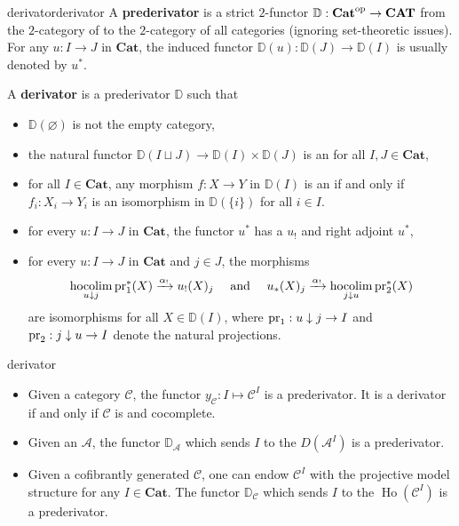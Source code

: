 \begin{topic}{derivator}{derivator}
    A \textbf{prederivator} is a strict $2$-functor $\mathbb{D} : \textbf{Cat}^\textup{op} \to \textbf{CAT}$ from the $2$-category of  to the $2$-category of all categories (ignoring set-theoretic issues). For any $u : I \to J$ in $\textbf{Cat}$, the induced functor $\mathbb{D}(u) : \mathbb{D}(J) \to \mathbb{D}(I)$ is usually denoted by $u^*$.

    A \textbf{derivator} is a prederivator $\mathbb{D}$ such that
    \begin{itemize}
        \item $\mathbb{D}(\varnothing)$ is not the empty category,
        \item the natural functor $\mathbb{D}(I \sqcup J) \to \mathbb{D}(I) \times \mathbb{D}(J)$ is an  for all $I, J \in \textbf{Cat}$,
        \item for all $I \in \textbf{Cat}$, any morphism $f : X \to Y$ in $\mathbb{D}(I)$ is an  if and only if $f_i : X_i \to Y_i$ is an isomorphism in $\mathbb{D}(\{ i \})$ for all $i \in I$.
        \item for every $u : I \to J$ in $\textbf{Cat}$, the functor $u^*$ has a  $u_!$ and right adjoint $u^*$,
        \item for every $u : I \to J$ in $\textbf{Cat}$ and $j \in J$, the morphisms
        \[ \operatorname*{hocolim}_{u \downarrow j} \textup{pr}_1^*(X) \xrightarrow{\alpha_!} u_!(X)_j \quad \textup{ and } \quad u_*(X)_j \xrightarrow{\alpha_!} \operatorname*{hocolim}_{j \downarrow u} \textup{pr}_2^*(X) \]
        are isomorphisms for all $X \in \mathbb{D}(I)$, where $\textup{pr}_1 : u \downarrow j \to I$ and $\textup{pr}_2 : j \downarrow u \to I$ denote the natural projections.
    \end{itemize}
\end{topic}

\begin{example}{derivator}
    \begin{itemize}
        \item Given a category $\mathcal{C}$, the functor $y_\mathcal{C} : I \mapsto \mathcal{C}^I$ is a prederivator. It is a derivator if and only if $\mathcal{C}$ is  and cocomplete.
        \item Given an  $\mathcal{A}$, the functor $\mathbb{D}_\mathcal{A}$ which sends $I$ to the  $D(\mathcal{A}^I)$ is a prederivator.
        \item Given a cofibrantly generated  $\mathcal{C}$, one can endow $\mathcal{C}^I$ with the projective model structure for any $I \in \textbf{Cat}$. The functor $\mathbb{D}_\mathcal{C}$ which sends $I$ to the  $\operatorname{Ho}(\mathcal{C}^I)$ is a prederivator.
    \end{itemize}
\end{example}

